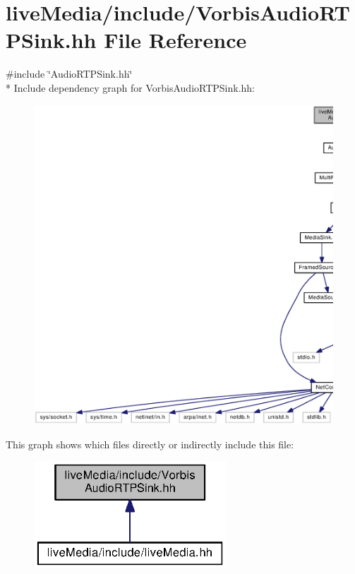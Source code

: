 \section{live\+Media/include/\+Vorbis\+Audio\+R\+T\+P\+Sink.hh File Reference}
\label{VorbisAudioRTPSink_8hh}
{\ttfamily \#include \char`\"{}Audio\+R\+T\+P\+Sink.\+hh\char`\"{}}\\*
Include dependency graph for Vorbis\+Audio\+R\+T\+P\+Sink.\+hh\+:
\nopagebreak
\begin{figure}[H]
\begin{center}
\leavevmode
\includegraphics[width=350pt]{VorbisAudioRTPSink_8hh__incl}
\end{center}
\end{figure}
This graph shows which files directly or indirectly include this file\+:
\nopagebreak
\begin{figure}[H]
\begin{center}
\leavevmode
\includegraphics[width=204pt]{VorbisAudioRTPSink_8hh__dep__incl}
\end{center}
\end{figure}
